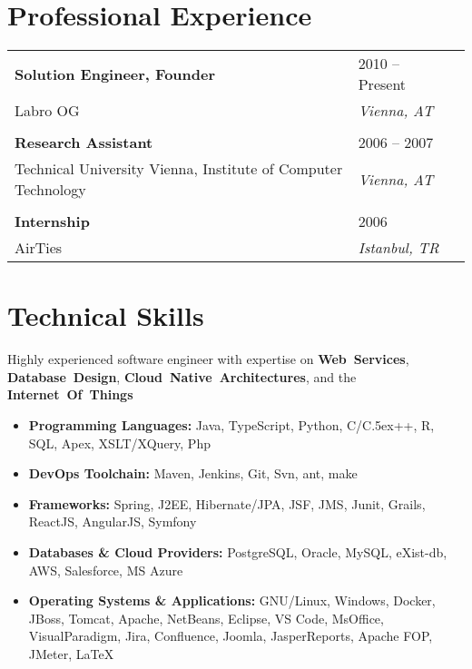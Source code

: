 \documentclass[letterpaper,11pt]{article}
\def\Cplusplus{{\rm C\raise.5ex\hbox{\tiny ++}}}
\begin{document}

\section{\bf Professional Experience}
\begin{longtable}{  L{0.70\textwidth}  R{0.25\textwidth}  R{0.05\textwidth }} 
\textbf{Solution Engineer, Founder} & 2010 -- Present \\
Labro OG & \textit{Vienna, AT} \\
\vspace{1pt}\\
\textbf{Research Assistant} & 2006 -- 2007\\
Technical University Vienna, Institute of Computer Technology & \textit{Vienna, AT} \\
\vspace{1pt}\\
\textbf{Internship} & 2006\\
AirTies & \textit{Istanbul, TR} \\
\end{longtable}

\section{\bf Technical Skills}
Highly experienced software engineer with expertise on \textbf{Web~Services}, \textbf{Database~Design}, \textbf{Cloud~Native~Architectures}, and the \textbf{Internet~Of~Things}
\begin{itemize}
\item \textbf{Programming Languages:} Java, TypeScript, Python, C/\Cplusplus, R, SQL, Apex, XSLT/XQuery, Php
\item \textbf{DevOps Toolchain:} Maven, Jenkins, Git, Svn, ant, make
\item \textbf{Frameworks:} Spring, J2EE, Hibernate/JPA, JSF, JMS, Junit, Grails, ReactJS, AngularJS, Symfony
\item \textbf{Databases \& Cloud Providers:}  PostgreSQL, Oracle, MySQL, eXist-db, AWS, Salesforce, MS Azure
\item \textbf{Operating Systems \& Applications:}  GNU/Linux, Windows, Docker, JBoss, Tomcat, Apache, NetBeans, Eclipse, VS Code, MsOffice, VisualParadigm, Jira, Confluence, Joomla, JasperReports, Apache FOP, JMeter, \LaTeX
\end{itemize}
\end{document}
